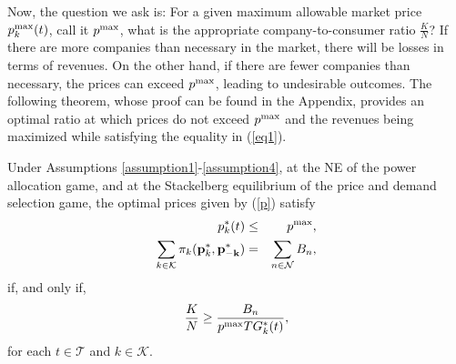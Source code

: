 Now, the question we ask is: For a given maximum allowable market price $p^{{\rm max}}_k(t)$, call it $p^{{\rm max}}$, what is the appropriate company-to-consumer ratio $\frac{K}{N}$? If there are more companies than necessary in the market, there will be losses in terms of revenues. On the other hand, if there are fewer companies than necessary, the prices can exceed $p^{{\rm max}}$, leading to undesirable outcomes. The following theorem, whose proof can be found in the Appendix, provides an optimal ratio at which prices do not exceed $p^{{\rm max}}$ and the revenues being maximized while satisfying the equality in (\ref{eq1}). 
{\color{black}
\begin{theorem}
Under Assumptions \ref{assumption1}-\ref{assumption4}, at the NE of the power allocation game, and at the Stackelberg equilibrium of the price and demand selection game, the optimal prices given by (\ref{p}) satisfy  
\begin{eqnarray*}
 p^*_k(t) &\leq &p^{{\rm max}},\\
 \sum_{k\in {\cal K}}\pi_k({\bf{p}}^*_k,{\bf{p^*_{-k}}})&=&\sum_{n\in {\cal N}}B_n,
\end{eqnarray*}
if, and only if, \begin{equation*} \frac{K}{N} \geq \frac{B_n}{p^{{\rm max}}TG^*_k(t)}, \end{equation*}
for each $t \in \mathcal{T}$ and $k\in\mathcal{K}$.
\end{theorem}}


